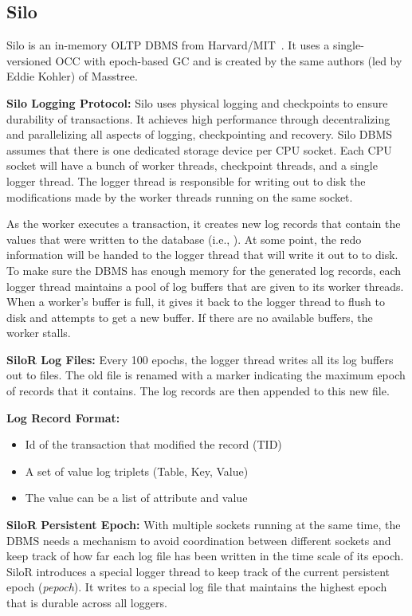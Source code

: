 \documentclass[11pt]{article}
\begin{document}
\subsection*{Silo}
Silo is an in-memory OLTP DBMS from Harvard/MIT~\cite{zheng-osdi14}. It uses a single-versioned OCC with epoch-based GC and is created by the same authors (led by Eddie Kohler) of Masstree.

\textbf{Silo Logging Protocol:} Silo uses physical logging and checkpoints to ensure durability of transactions. It achieves high performance through decentralizing and parallelizing all aspects of logging, checkpointing and recovery. Silo DBMS assumes that there is one dedicated storage device per CPU socket. Each CPU socket will have a bunch of worker threads, checkpoint threads, and a single logger thread. The logger thread is responsible for writing out to disk the modifications made by the worker threads running on the same socket.

As the worker executes a transaction, it creates new log records that contain the values that were written to the database (i.e., ). At some point, the redo information will be handed to the logger thread that will write it out to to disk. To make sure the DBMS has enough memory for the generated log records, each logger thread maintains a pool of log buffers that are given to its worker threads. When a worker's buffer is full, it gives it back to the logger thread to flush to disk and attempts to get a new buffer. If there are no available buffers, the worker stalls.

\textbf{SiloR Log Files:} Every 100 epochs, the logger thread writes all its log buffers out to files. The old file is renamed with a marker indicating the maximum epoch of records that it contains. The log records are then appended to this new file.

\textbf{Log Record Format:}
\begin{itemize}
    \item Id of the transaction that modified the record (TID)
    \item A set of value log triplets (Table, Key, Value)
    \item The value can be a list of attribute and value
\end{itemize}

\textbf{SiloR Persistent Epoch:} With multiple sockets running at the same time, the DBMS needs a mechanism to avoid coordination between different sockets and keep track of how far each log file has been written in the time scale of its epoch. SiloR introduces a special logger thread to keep track of the current persistent epoch (\textit{pepoch}). It writes to a special log file that maintains the highest epoch that is durable across all loggers.
\end{document}
